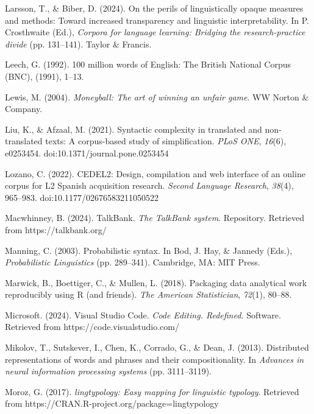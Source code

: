 \documentclass[
  letterpaper,
  krantz1]{latex/krantz-mod}
\newlength{\cslhangindent}
\newenvironment{CSLReferences}[2] %
 {\begin{list}{}{%
  \setlength{\itemindent}{0pt}
  \setlength{\leftmargin}{0pt}
  \setlength{\parsep}{0pt}
  \ifodd #1
   \setlength{\leftmargin}{\cslhangindent}
   \setlength{\itemindent}{-1\cslhangindent}
  \fi
  \setlength{\itemsep}{#2\baselineskip}}}
 {\end{list}}
\theoremstyle{definition}
\theoremstyle{definition}
\theoremstyle{remark}
\begin{document}
\begin{CSLReferences}{1}{0}
Larsson, T., \& Biber, D. (2024). On the perils of linguistically opaque
measures and methods: {Toward} increased transparency and linguistic
interpretability. In P. Crosthwaite (Ed.), \emph{Corpora for language
learning: {Bridging} the research-practice divide} (pp. 131--141).
Taylor \& Francis.

Leech, G. (1992). 100 million words of {English}: {The British National
Corpus} ({BNC}), (1991), 1--13.

Lewis, M. (2004). \emph{Moneyball: {The} art of winning an unfair game}.
WW Norton \& Company.

Liu, K., \& Afzaal, M. (2021). Syntactic complexity in translated and
non-translated texts: A corpus-based study of simplification. \emph{PLoS
ONE}, \emph{16}(6), e0253454. doi:10.1371/journal.pone.0253454

Lozano, C. (2022). {CEDEL2}: {Design}, compilation and web interface of
an online corpus for {L2 Spanish} acquisition research. \emph{Second
Language Research}, \emph{38}(4), 965--983.
doi:10.1177/02676583211050522

Macwhinney, B. (2024). {TalkBank}. \emph{The TalkBank system}.
Repository. Retrieved from https://talkbank.org/

Manning, C. (2003). Probabilistic syntax. In Bod, J. Hay, \& Jannedy
(Eds.), \emph{Probabilistic {Linguistics}} (pp. 289--341). Cambridge,
MA: MIT Press.

Marwick, B., Boettiger, C., \& Mullen, L. (2018). Packaging data
analytical work reproducibly using {R} (and friends). \emph{The American
Statistician}, \emph{72}(1), 80--88.

Microsoft. (2024). Visual {Studio Code}. \emph{Code Editing. Redefined.}
Software. Retrieved from https://code.visualstudio.com/

Mikolov, T., Sutskever, I., Chen, K., Corrado, G., \& Dean, J. (2013).
Distributed representations of words and phrases and their
compositionality. In \emph{Advances in neural information processing
systems} (pp. 3111--3119).

Moroz, G. (2017). \emph{{lingtypology}: Easy mapping for linguistic
typology}. Retrieved from
https://CRAN.R-project.org/package=lingtypology


\end{CSLReferences}
\end{document}
